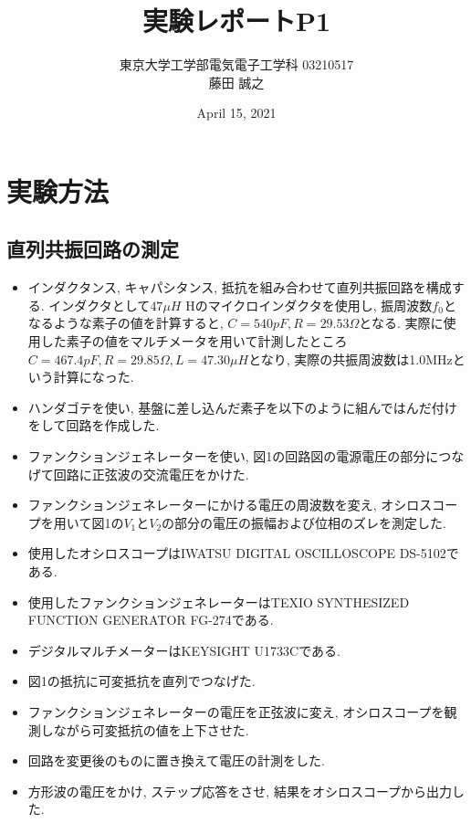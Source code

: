 \documentclass[a4j,dvipdfmx]{article}
\title{実験レポートP1}
\author{東京大学工学部電気電子工学科 03210517\\ 藤田 誠之 }
\date{April 15, 2021}
\begin{document}
\maketitle

\section{実験方法}
\subsection{直列共振回路の測定}
\begin{itemize}
\item インダクタンス, キャパシタンス, 抵抗を組み合わせて直列共振回路を構成する. インダクタとして$47\mu H$ Hのマイクロインダクタを使用し, 振周波数$f_0$となるような素子の値を計算すると, $C=540pF, R=29.53\Omega$となる. 実際に使用した素子の値をマルチメータを用いて計測したところ$C=467.4pF, R=29.85\Omega, L=47.30\mu H$となり, 実際の共振周波数は1.0MHzという計算になった. 
\item ハンダゴテを使い, 基盤に差し込んだ素子を以下のように組んではんだ付けをして回路を作成した. 
\item ファンクションジェネレーターを使い, 図1の回路図の電源電圧の部分につなげて回路に正弦波の交流電圧をかけた. 
\item ファンクションジェネレーターにかける電圧の周波数を変え, オシロスコープを用いて図1の$V_1$と$V_2$の部分の電圧の振幅および位相のズレを測定した. 
\item 使用したオシロスコープはIWATSU DIGITAL OSCILLOSCOPE DS-5102である.
\item 使用したファンクションジェネレーターはTEXIO SYNTHESIZED FUNCTION GENERATOR FG-274である.
\item デジタルマルチメーターはKEYSIGHT U1733Cである.
\item 図1の抵抗に可変抵抗を直列でつなげた. 
\item ファンクションジェネレーターの電圧を正弦波に変え, オシロスコープを観測しながら可変抵抗の値を上下させた. 
\item 回路を変更後のものに置き換えて電圧の計測をした. 
\item 方形波の電圧をかけ, ステップ応答をさせ, 結果をオシロスコープから出力した. 
\end{itemize}
\end{document}
